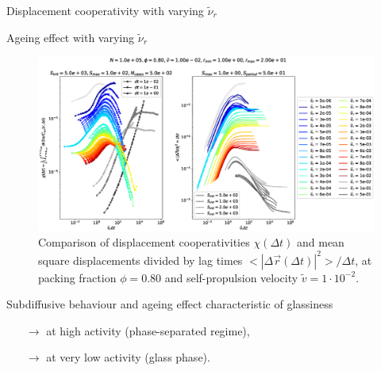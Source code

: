 \documentclass{beamer}
\begin{document}
\begin{frame}{Displacement cooperativity with varying $\tilde{\nu}_r$}
\vspace{-0.5cm}

\end{frame}

\begin{frame}{Ageing effect with varying $\tilde{\nu}_r$}

\vspace{-0.2cm}
\begin{figure}[h!]
  \centering
  \includegraphics[width=0.8\linewidth]{intCuu_msdt_Dk8000_Vj1000_Nq1000_Io5000_Mn1000_Cn5000_RMINl1000_RMAXm2000.eps}
  \vspace{-0.2cm}
  \caption{Comparison of displacement cooperativities $\chi(\Delta t)$ and mean square displacements divided by lag times $<|\Delta\vec{r}(\Delta t)|^2>/\Delta t$, at packing fraction $\phi=0.80$ and self-propulsion velocity $\tilde{v}=1\cdot10^{-2}$.}
\end{figure}
\vspace{-0.3cm}
Subdiffusive behaviour and ageing effect characteristic of glassiness
\begin{itemize}
  \item[$\rightarrow$] at high activity (phase-separated regime),
  \item[$\rightarrow$] at very low activity (glass phase).
\end{itemize}

\end{frame}
\end{document}
